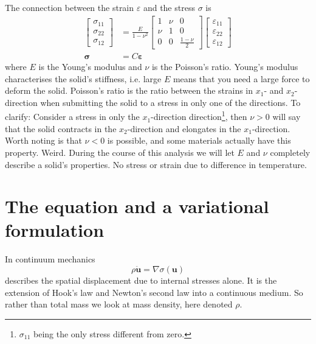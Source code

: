 \documentclass[paper=a4, fontsize=11pt]{scrartcl} %
\begin{document}
The connection between the strain $\varepsilon$ and the stress $\sigma$ is
\begin{align*}
\begin{bmatrix}
\sigma_{11} \\ \sigma_{22} \\ \sigma_{12}
\end{bmatrix}
&= \frac{E}{1-\nu^2}\begin{bmatrix}
1 & \nu & 0 \\
\nu & 1 & 0 \\
0 & 0 & \frac{1-\nu}{2}
\end{bmatrix}
\begin{bmatrix}
\varepsilon_{11} \\ \varepsilon_{22} \\ \varepsilon_{12}
\end{bmatrix} \\
\boldsymbol{\sigma} &= C\boldsymbol{\varepsilon}
\end{align*}
where $E$ is the Young's modulus and $\nu$ is the Poisson's ratio. Young's modulus characterises the solid's stiffness, i.e. large $E$ means that you need a large force to deform the solid. Poisson's ratio  is the ratio between the strains in $x_1$- and $x_2$-direction when submitting the solid to a stress in only one of the directions. To clarify: Consider a stress in only the $x_1$-direction direction\footnote{$\sigma_{11}$ being the only stress different from zero.}, then $\nu>0$ will say that the solid contracts in the $x_2$-direction and elongates in the $x_1$-direction. Worth noting is that $\nu<0$ is possible, and some materials actually have this property. Weird.
During the course of this analysis we will let $E$ and $\nu$ completely describe a solid's properties. No stress or strain due to difference in temperature.

\section*{The equation and a variational formulation}
In continuum mechanics
\begin{equation}
\label{vibDiff}
\rho \ddot{\boldsymbol{u}} = \nabla \sigma(\boldsymbol{u})
\end{equation}
describes the spatial displacement due to internal stresses alone. It is the extension of Hook's law and Newton's second law into a continuous medium. So rather than total mass we look at mass density, here denoted $\rho$.
\end{document}
